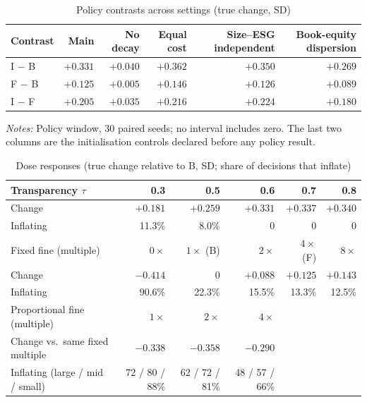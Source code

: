 \documentclass[11pt]{article}
\begin{document}
\begin{table}[h]
\centering
\small
\begin{threeparttable}
\caption{Policy contrasts across settings (true change, SD)}
\label{tab:robustness}
\begin{tabular}{@{}lrrrrr@{}}
\toprule
Contrast & Main & No decay & Equal cost & Size--ESG independent & Book-equity dispersion \\
\midrule
I $-$ B & $+0.331$ & $+0.040$ & $+0.362$ & $+0.350$ & $+0.269$ \\
F $-$ B & $+0.125$ & $+0.005$ & $+0.146$ & $+0.126$ & $+0.089$ \\
I $-$ F & $+0.205$ & $+0.035$ & $+0.216$ & $+0.224$ & $+0.180$ \\
\bottomrule
\end{tabular}
\begin{tablenotes}[flushleft]\footnotesize
\item \textit{Notes:} Policy window, 30 paired seeds; no interval includes zero. The last two columns are the initialisation controls declared before any policy result.
\end{tablenotes}
\end{threeparttable}
\end{table}

\begin{table}[h]
\centering
\small
\begin{threeparttable}
\caption{Dose responses (true change relative to B, SD; share of decisions that inflate)}
\label{tab:doses}
\begin{tabular}{@{}lrrrrr@{}}
\toprule
Transparency $\tau$ & 0.3 & 0.5 & 0.6 & 0.7 & 0.8 \\
\midrule
Change & $+0.181$ & $+0.259$ & $+0.331$ & $+0.337$ & $+0.340$ \\
Inflating & 11.3\% & 8.0\% & 0 & 0 & 0 \\
\midrule
Fixed fine (multiple) & $0\times$ & $1\times$ (B) & $2\times$ & $4\times$ (F) & $8\times$ \\
\midrule
Change & $-0.414$ & 0 & $+0.088$ & $+0.125$ & $+0.143$ \\
Inflating & 90.6\% & 22.3\% & 15.5\% & 13.3\% & 12.5\% \\
\midrule
Proportional fine (multiple) & $1\times$ & $2\times$ & $4\times$ & & \\
\midrule
Change vs.\ same fixed multiple & $-0.338$ & $-0.358$ & $-0.290$ & & \\
Inflating (large / mid / small) & 72 / 80 / 88\% & 62 / 72 / 81\% & 48 / 57 / 66\% & & \\
\bottomrule
\end{tabular}
\end{threeparttable}
\end{table}
\end{document}
